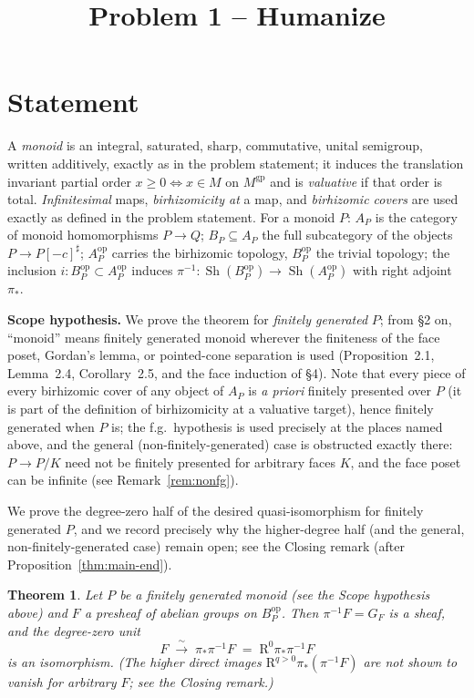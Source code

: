 \documentclass[11pt]{article}
\title{Problem 1 -- Humanize}
\author{}
\date{}
\newtheorem{theorem}{Theorem}[section]
\theoremstyle{definition}
\newcommand{\gp}{\mathrm{gp}}
\newcommand{\op}{\mathrm{op}}
\newcommand{\Sh}{\operatorname{Sh}}
\begin{document}
\maketitle

\section{Statement}\label{sec:intro}

A \emph{monoid} is an integral, saturated, sharp, commutative, unital
semigroup, written additively, exactly as in the problem statement; it
induces the translation invariant partial order $x\ge0\iff x\in M$ on
$M^{\gp}$ and is \emph{valuative} if that order is total.
\emph{Infinitesimal} maps, \emph{birhizomicity at} a map, and
\emph{birhizomic covers} are used exactly as defined in the problem
statement. For a monoid $P$: $A_P$ is the category of monoid
homomorphisms $P\to Q$; $B_P\subseteq A_P$ the full subcategory of the
objects $P\to P[-c]^{\sharp}$; $A_P^{\op}$ carries the birhizomic
topology, $B_P^{\op}$ the trivial topology; the inclusion
$i:B_P^{\op}\subset A_P^{\op}$ induces
$\pi^{-1}:\Sh(B_P^{\op})\to\Sh(A_P^{\op})$ with right adjoint $\pi_{*}$.

\noindent\textbf{Scope hypothesis.} We prove the theorem for
\emph{finitely generated} $P$; from \S2 on, ``monoid'' means
finitely generated monoid wherever the finiteness of the face poset,
Gordan's lemma, or pointed-cone separation is used (Proposition~2.1,
Lemma~2.4, Corollary~2.5, and the face induction of \S4). Note that
every piece of every birhizomic cover of any object of $A_P$ is
\emph{a priori} finitely presented over $P$ (it is part of the
definition of birhizomicity at a valuative target), hence finitely
generated when $P$ is; the f.g.\ hypothesis is used precisely at the
places named above, and the general (non-finitely-generated) case is
obstructed exactly there: $P\to P/K$ need not be finitely presented
for arbitrary faces $K$, and the face poset can be infinite (see
Remark~\ref{rem:nonfg}).

We prove the degree-zero half of the desired quasi-isomorphism for
finitely generated $P$, and we record precisely why the higher-degree
half (and the general, non-finitely-generated case) remain open; see
the Closing remark (after Proposition~\ref{thm:main-end}).

\begin{theorem}\label{thm:main}
Let $P$ be a \emph{finitely generated} monoid \textup{(}see the Scope
hypothesis above\textup{)} and $F$ a presheaf of abelian groups on
$B_P^{\op}$. Then $\pi^{-1}F=G_F$ is a sheaf, and the degree-zero
unit
\[
F\;\xrightarrow{\ \sim\ }\;\pi_{*}\pi^{-1}F
\;=\;\mathrm R^{0}\pi_{*}\pi^{-1}F
\]
is an isomorphism. \textup{(}The higher direct images
$\mathrm R^{q>0}\pi_{*}(\pi^{-1}F)$ are \emph{not} shown to vanish
for arbitrary $F$; see the Closing remark.\textup{)}
\end{theorem}
\end{document}
